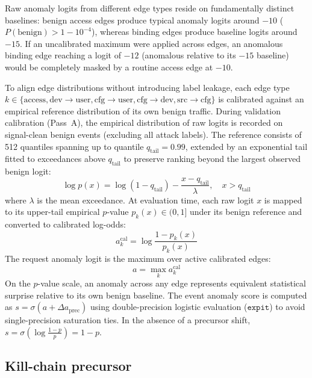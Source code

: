 Raw anomaly logits from different edge types reside on fundamentally distinct baselines: benign access
edges produce typical anomaly logits around $-10$ ($P(\text{benign}) > 1 - 10^{-4}$), whereas binding
edges produce baseline logits around $-15$. If an uncalibrated maximum were applied across edges, an
anomalous binding edge reaching a logit of $-12$ (anomalous relative to its $-15$ baseline) would be
completely masked by a routine access edge at $-10$.

To align edge distributions without introducing label leakage, each edge type $k \in \{\text{access},
\text{dev}\rightarrow\text{user}, \text{cfg}\rightarrow\text{user}, \text{cfg}\rightarrow\text{dev},
\text{src}\rightarrow\text{cfg}\}$ is calibrated against an empirical reference distribution of its
own benign traffic. During validation calibration (Pass~A), the empirical distribution of raw logits
is recorded on signal-clean benign events (excluding all attack labels). The reference consists of
512 quantiles spanning up to quantile $q_{\text{tail}} = 0.99$, extended by an exponential tail fitted
to exceedances above $q_{\text{tail}}$ to preserve ranking beyond the largest observed benign logit:
\begin{equation}
\log p(x) = \log(1 - q_{\text{tail}}) - \frac{x - q_{\text{tail}}}{\lambda}, \quad x > q_{\text{tail}}
\end{equation}
where $\lambda$ is the mean exceedance. At evaluation time, each raw logit $x$ is mapped to its
upper-tail empirical $p$-value $p_k(x) \in (0, 1]$ under its benign reference and converted to
calibrated log-odds:
\begin{equation}
a_k^{\text{cal}} = \log \frac{1 - p_k(x)}{p_k(x)}
\end{equation}
The request anomaly logit is the maximum over active calibrated edges:
\begin{equation}
a = \max_{k} a_k^{\text{cal}}
\end{equation}
On the $p$-value scale, an anomaly across any edge represents equivalent statistical surprise relative
to its own benign baseline. The event anomaly score is computed as $s = \sigma(a + \Delta a_{\text{prec}})$
using double-precision logistic evaluation ($\texttt{expit}$) to avoid single-precision saturation
ties. In the absence of a precursor shift, $s = \sigma(\log\frac{1-p}{p}) = 1 - p$.

\subsection{Kill-chain precursor}

